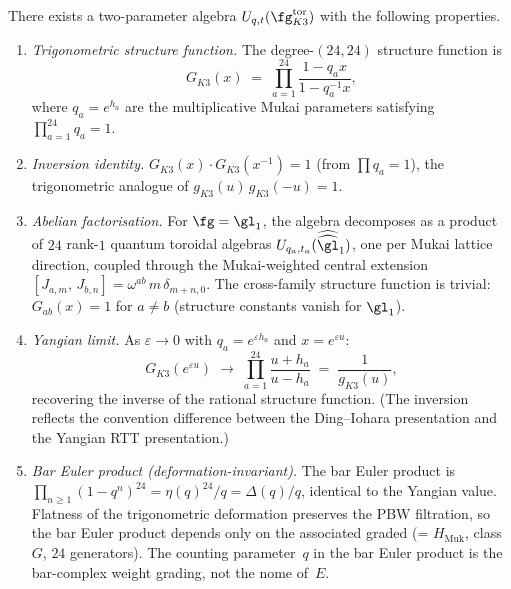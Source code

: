 \begin{conjecture}
\label{conj:k3-quantum-toroidal}
\ClaimStatusConjectured
There exists a two-parameter algebra
$U_{q,t}(\fg_{K3}^{\mathrm{tor}})$ with the following properties.
\begin{enumerate}[label=\textup{(\roman*)}]
\item \emph{Trigonometric structure function.}
The degree-$(24,24)$ structure function is
\begin{equation}\label{eq:k3-qt-structure-fn}
 G_{K3}(x) \;=\; \prod_{a=1}^{24}
 \frac{1 - q_a x}{1 - q_a^{-1} x},
\end{equation}
where $q_a = e^{h_a}$ are the multiplicative Mukai parameters
satisfying $\prod_{a=1}^{24} q_a = 1$.

\item \emph{Inversion identity.}
$G_{K3}(x) \cdot G_{K3}(x^{-1}) = 1$ (from $\prod q_a = 1$),
the trigonometric analogue of $g_{K3}(u)\, g_{K3}(-u) = 1$.

\item \emph{Abelian factorisation.}
For $\fg = \gl_1$, the algebra decomposes as a product of $24$
rank-$1$ quantum toroidal algebras
$U_{q_a, t_a}(\widehat{\widehat{\gl}}_1)$, one per Mukai lattice
direction, coupled through the Mukai-weighted central extension
$[J_{a,m},\, J_{b,n}] = \omega^{ab}\, m\, \delta_{m+n,0}$.
The cross-family structure function is trivial:
$G_{ab}(x) = 1$ for $a \neq b$ (structure constants vanish for $\gl_1$).

\item \emph{Yangian limit.}
As $\varepsilon \to 0$ with $q_a = e^{\varepsilon h_a}$
and $x = e^{\varepsilon u}$:
\[
 G_{K3}(e^{\varepsilon u})
 \;\longrightarrow\;
 \prod_{a=1}^{24} \frac{u + h_a}{u - h_a}
 \;=\; \frac{1}{g_{K3}(u)},
\]
recovering the inverse of the rational structure function.
(The inversion reflects the convention difference between
the Ding--Iohara presentation and the Yangian RTT presentation.)

\item \emph{Bar Euler product (deformation-invariant).}
The bar Euler product is $\prod_{n \geq 1}(1-q^n)^{24}
= \eta(q)^{24}/q = \Delta(q)/q$, identical to the Yangian value.
Flatness of the trigonometric deformation preserves the PBW
filtration, so the bar Euler product depends only on the
associated graded (= $H_{\mathrm{Muk}}$, class~$G$, $24$ generators).
The counting parameter~$q$ in the bar Euler product is the bar-complex
weight grading, not the nome of~$E$.


\end{enumerate}
\end{conjecture}
